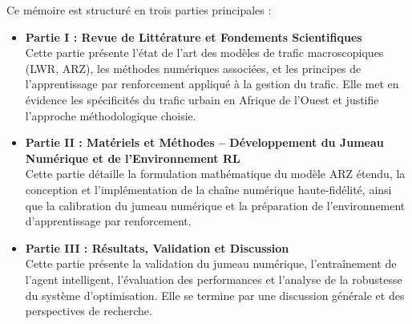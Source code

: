 Ce mémoire est structuré en trois parties principales :

\begin{itemize}
    \item \textbf{Partie I : Revue de Littérature et Fondements Scientifiques} \\
    Cette partie présente l'état de l'art des modèles de trafic macroscopiques (LWR, ARZ), les méthodes numériques associées, et les principes de l'apprentissage par renforcement appliqué à la gestion du trafic. Elle met en évidence les spécificités du trafic urbain en Afrique de l'Ouest et justifie l'approche méthodologique choisie.

    \item \textbf{Partie II : Matériels et Méthodes – Développement du Jumeau Numérique et de l'Environnement RL} \\
    Cette partie détaille la formulation mathématique du modèle ARZ étendu, la conception et l'implémentation de la chaîne numérique haute-fidélité, ainsi que la calibration du jumeau numérique et la préparation de l'environnement d'apprentissage par renforcement.

    \item \textbf{Partie III : Résultats, Validation et Discussion} \\
    Cette partie présente la validation du jumeau numérique, l'entraînement de l'agent intelligent, l'évaluation des performances et l'analyse de la robustesse du système d'optimisation. Elle se termine par une discussion générale et des perspectives de recherche.
\end{itemize}

